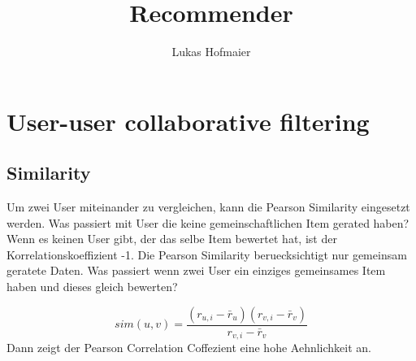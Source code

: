 \documentclass[a4paper, 11pt]{article}
\author{Lukas Hofmaier}
\title{Recommender}
\begin{document}
\maketitle
\section{User-user collaborative filtering}
\subsection{Similarity}
Um zwei User miteinander zu vergleichen, kann die Pearson Similarity eingesetzt werden.
Was passiert mit User die keine gemeinschaftlichen Item gerated haben? 
Wenn es keinen User gibt, der das selbe Item bewertet hat, ist der Korrelationskoeffizient -1.
Die Pearson Similarity beruecksichtigt nur gemeinsam geratete Daten.
Was passiert wenn zwei User ein einziges gemeinsames Item haben und dieses gleich bewerten?


\begin{equation}
 sim(u,v) = \frac{(r_{u,i} - \bar{r}_u)(r_{v,i} - \bar{r}_v)}{r_{v,i} - \bar{r}_v}    
\end{equation}
Dann zeigt der Pearson Correlation Coffezient eine hohe Aehnlichkeit an.
\end{document}
